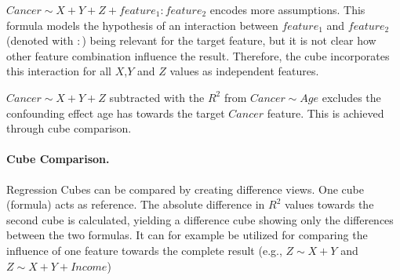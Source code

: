 \documentclass[journal]{style/vgtc} 			          %
\begin{document}
$Cancer \sim X + Y + Z + feature_1:feature_2$ encodes more assumptions.
This formula models the hypothesis of an interaction between $feature_1$ and $feature_2$ (denoted with $:$) being relevant for the target feature, but it is not clear how other feature combination influence the result.
Therefore, the cube incorporates this interaction for all $X$,$Y$ and $Z$ values as independent features.

$Cancer \sim X + Y + Z$ subtracted with the $R^2$ from $Cancer \sim Age$ excludes the confounding effect age has towards the target $Cancer$ feature.
This is achieved through cube comparison.

\paragraph{Cube Comparison.}
Regression Cubes can be compared by creating difference views.
One cube (formula) acts as reference.
The absolute difference in $R^2$ values towards the second cube is calculated, yielding a difference cube showing only the differences between the two formulas.
It can for example be utilized for comparing the influence of one feature towards the complete result (e.g., $Z \sim X + Y$ and $Z \sim X + Y + Income$)
%
\end{document}
